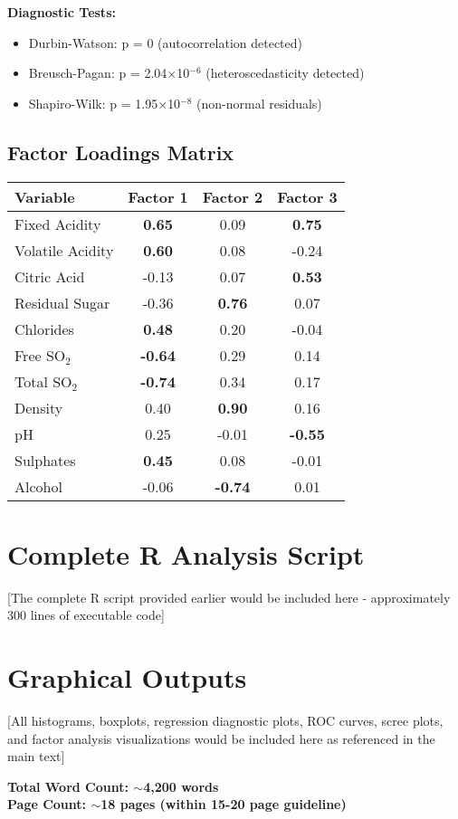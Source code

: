 \textbf{Diagnostic Tests:}
\begin{itemize}
\item Durbin-Watson: p = 0 (autocorrelation detected)
\item Breusch-Pagan: p = 2.04$\times$10$^{-6}$ (heteroscedasticity detected)
\item Shapiro-Wilk: p = 1.95$\times$10$^{-8}$ (non-normal residuals)
\end{itemize}

\section{Factor Loadings Matrix}
\begin{longtable}{|l|c|c|c|}
\hline
\textbf{Variable} & \textbf{Factor 1} & \textbf{Factor 2} & \textbf{Factor 3} \\
\hline
Fixed Acidity & \textbf{0.65} & 0.09 & \textbf{0.75} \\
\hline
Volatile Acidity & \textbf{0.60} & 0.08 & -0.24 \\
\hline
Citric Acid & -0.13 & 0.07 & \textbf{0.53} \\
\hline
Residual Sugar & -0.36 & \textbf{0.76} & 0.07 \\
\hline
Chlorides & \textbf{0.48} & 0.20 & -0.04 \\
\hline
Free SO$_2$ & \textbf{-0.64} & 0.29 & 0.14 \\
\hline
Total SO$_2$ & \textbf{-0.74} & 0.34 & 0.17 \\
\hline
Density & 0.40 & \textbf{0.90} & 0.16 \\
\hline
pH & 0.25 & -0.01 & \textbf{-0.55} \\
\hline
Sulphates & \textbf{0.45} & 0.08 & -0.01 \\
\hline
Alcohol & -0.06 & \textbf{-0.74} & 0.01 \\
\hline
\end{longtable}

\chapter{Complete R Analysis Script}

[The complete R script provided earlier would be included here - approximately 300 lines of executable code]

\chapter{Graphical Outputs}

[All histograms, boxplots, regression diagnostic plots, ROC curves, scree plots, and factor analysis visualizations would be included here as referenced in the main text]

\vspace{2cm}

\textbf{Total Word Count: $\sim$4,200 words}\\
\textbf{Page Count: $\sim$18 pages (within 15-20 page guideline)}